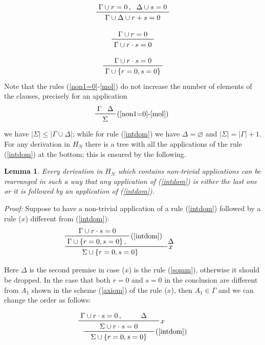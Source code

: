 \documentclass[a4paper,12pt,oneside]{book}
\newtheorem{lemma}[theorem]{Lemma}
\let\emptyset\varnothing
\begin{document}
\begin{equation}\label{somm}
\prftree{\Gamma \cup r=0 \, ,}{\Delta \cup s=0}{\Gamma \cup \Delta \cup r+s=0 } 
\end{equation}

\begin{equation} \label{mol}
\prftree{\Gamma \cup r=0}{\Gamma \cup r\cdot s=0 } 
\end{equation}

\begin{equation} \label{intdom}
\prftree{\Gamma \cup r\cdot s=0}{\Gamma \cup  \{r=0,s=0\} } 
\end{equation}
Note that the rules (\ref{non1=0}-\ref{mol}) do not increase the number of elements of the clauses, precisely for an application 
$$
\prftree[r]{(\ref{non1=0}-\ref{mol}) } {\Gamma}{\Delta}{\hspace{2mm}\Sigma\hspace{2mm}}
$$
we have $ |\Sigma| \leq   |\Gamma\cup\Delta|$; while for rule (\ref{intdom})
we have $\Delta = \emptyset$ and  $ |\Sigma| =   |\Gamma| +1 $. \\

For any derivation in $H_N$ there is a tree with all the applications of the rule (\ref{intdom}) at the bottom; this is ensured by the following.
\begin{lemma}\label{lemma_nullest}\textit{Every derivation in $H_N$ which contains non-trivial applications can be rearranged in such a way that any application of (\ref{intdom}) is either the last one or it is followed by an application of (\ref{intdom})}.
\end{lemma}
\emph{\noindent \textit{Proof: }}Suppose to have a non-trivial application of a rule (\ref{intdom}) followed by a rule ($x$) different from (\ref{intdom}):
$$
\prftree[r]{$x$}
{\prftree[r]{(\ref{intdom})}
{\Gamma\cup r\cdot s=0 }
{\Gamma\cup\{r=0, s=0 \}\,,}
}
{\Delta \hspace{13mm}} 
{\hspace{7mm}\Sigma\cup\{r=0,s=0 \}\hspace{13mm}}
$$

\noindent Here $\Delta$ is the second premise in case ($x$) is the rule (\ref{somm}), otherwise it should be dropped. In the case that both $r=0$ and $s=0$ in the conclusion are different from $A_1$  shown in the scheme (\ref{axiom}) of the rule ($x$), then $A_1\in\Gamma$  and we can change the order as follows:

$$
\prftree[r]{(\ref{intdom})}
{\prftree[r]{$x$}
{\Gamma\cup r\cdot s=0 \, , \hspace{7mm}}    {\Delta \hspace{5mm}}
{\hspace{7mm}\Sigma\cup r\cdot s=0 \hspace{7mm}}}
{ {\Sigma\cup\{r=0, s=0 \}}} 
$$
\end{document}
